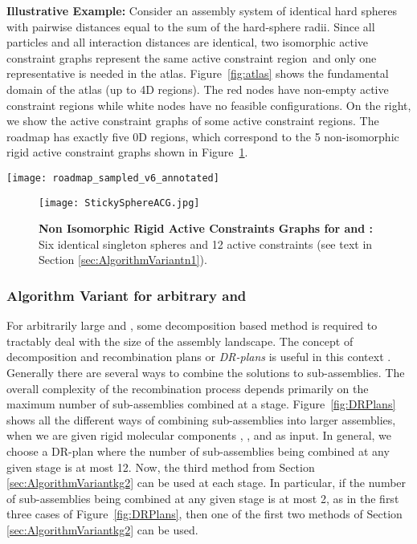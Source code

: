 \documentclass[]{article}
\newcommand{\figref}[1]{Figure~\ref{#1}}
\newcommand{\acgW}{active constraint graph}
\newcommand{\acr}{active constraint region}
\newcommand{\rmc}{rigid molecular component}
\begin{document}
\noindent\textbf{Illustrative Example:} Consider an assembly system of 
identical hard spheres with pairwise distances equal to the sum of the
hard-sphere radii. Since all particles and all interaction distances are
identical, two isomorphic \acgW s represent the same \acr\ and only one
representative is needed in the atlas.  \figref{fig:atlas} shows the
fundamental domain of the atlas (up to 4D regions). The red nodes have
non-empty \acr s while white nodes have no feasible configurations. On the
right, we show the active constraint graphs of some active constraint regions.
The roadmap has exactly five 0D regions, which correspond to the 5
non-isomorphic rigid active constraint graphs shown in \figref{fig:v6e12}. 

\begin{figure*}[htpb]
\centering
\texttt{[image: roadmap\_sampled\_v6\_annotated]}
\caption{\scriptsize \textbf{Atlas for  and  Assembly System}: 
The fundamental domain of the roadmap (up to 4D regions) for 
a  assembly system. Each node represents 
the \acr\ labeled by an \acgW. All the nodes in the same level have the same 
dimension. The red nodes have a non-empty \acr, the white nodes
have no feasible configurations. The graphs on the 
right of each level are the \acgW s of the nodes marked by arrows
		(see text in Section \ref{sec:AlgorithmVariantn1}).}
\label{fig:atlas}
\end{figure*}

\begin{figure}[htpb]
\centering
\texttt{[image: StickySphereACG.jpg]}
\caption{ \scriptsize 
\textbf{Non Isomorphic Rigid Active Constraints Graphs for  and :} Six identical singleton spheres and 12 active constraints 
(see text in Section \ref{sec:AlgorithmVariantn1}).}
\label{fig:v6e12}
\end{figure}

\subsubsection{Algorithm Variant for arbitrary  and }
\label{sec:AlgorithmVariantnk}
For arbitrarily large  and , some decomposition based method is required
to tractably deal with the size of the assembly landscape. The concept of
decomposition and recombination plans or \emph{DR-plans} is useful in this
context \cite{bib:HoLoSi98b,bib:HoLoSi98c,mvs2006}. Generally there are
several ways to combine the solutions to sub-assemblies. The overall complexity of the
recombination process depends primarily on the maximum number of sub-assemblies combined at 
a stage. \figref{fig:DRPlans} shows all the different ways of combining
sub-assemblies into larger assemblies, when we are given  \rmc s , ,
and  as input.  In general, we choose a DR-plan where the number of
sub-assemblies being combined at any given stage is at most 12.  Now, the third
method from Section \ref{sec:AlgorithmVariantkg2} can be used at each stage.
In particular, if the number of sub-assemblies being combined at any given stage is
at most 2, as in the first three cases of \figref{fig:DRPlans}, then one of the
first two methods of Section \ref{sec:AlgorithmVariantkg2} can be used.
\end{document}
